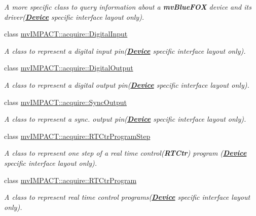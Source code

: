 \begin{DoxyCompactItemize}
\begin{DoxyCompactList}\small\item\em A more specific class to query information about a {\bfseries mv\+Blue\+F\+O\+X} device and its driver({\bfseries \hyperlink{classmv_i_m_p_a_c_t_1_1acquire_1_1_device}{Device}} specific interface layout only). \end{DoxyCompactList}\item 
class \hyperlink{classmv_i_m_p_a_c_t_1_1acquire_1_1_digital_input}{mv\+I\+M\+P\+A\+C\+T\+::acquire\+::\+Digital\+Input}
\begin{DoxyCompactList}\small\item\em A class to represent a digital input pin({\bfseries \hyperlink{classmv_i_m_p_a_c_t_1_1acquire_1_1_device}{Device}} specific interface layout only). \end{DoxyCompactList}\item 
class \hyperlink{classmv_i_m_p_a_c_t_1_1acquire_1_1_digital_output}{mv\+I\+M\+P\+A\+C\+T\+::acquire\+::\+Digital\+Output}
\begin{DoxyCompactList}\small\item\em A class to represent a digital output pin({\bfseries \hyperlink{classmv_i_m_p_a_c_t_1_1acquire_1_1_device}{Device}} specific interface layout only). \end{DoxyCompactList}\item 
class \hyperlink{classmv_i_m_p_a_c_t_1_1acquire_1_1_sync_output}{mv\+I\+M\+P\+A\+C\+T\+::acquire\+::\+Sync\+Output}
\begin{DoxyCompactList}\small\item\em A class to represent a sync. output pin({\bfseries \hyperlink{classmv_i_m_p_a_c_t_1_1acquire_1_1_device}{Device}} specific interface layout only). \end{DoxyCompactList}\item 
class \hyperlink{classmv_i_m_p_a_c_t_1_1acquire_1_1_r_t_ctr_program_step}{mv\+I\+M\+P\+A\+C\+T\+::acquire\+::\+R\+T\+Ctr\+Program\+Step}
\begin{DoxyCompactList}\small\item\em A class to represent one step of a real time control({\bfseries R\+T\+Ctr}) program ({\bfseries \hyperlink{classmv_i_m_p_a_c_t_1_1acquire_1_1_device}{Device}} specific interface layout only). \end{DoxyCompactList}\item 
class \hyperlink{classmv_i_m_p_a_c_t_1_1acquire_1_1_r_t_ctr_program}{mv\+I\+M\+P\+A\+C\+T\+::acquire\+::\+R\+T\+Ctr\+Program}
\begin{DoxyCompactList}\small\item\em A class to represent real time control programs({\bfseries \hyperlink{classmv_i_m_p_a_c_t_1_1acquire_1_1_device}{Device}} specific interface layout only). \end{DoxyCompactList}\item 

\end{DoxyCompactItemize}

